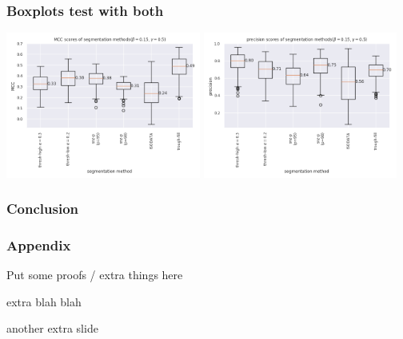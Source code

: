 \documentclass[9pt,notes]{beamer}
\begin{document}
\begin{frame}
\frametitle{Boxplots test with both}
\begin{center}
\includegraphics[width=0.48\textwidth]{190408-all-MCC-boxplot-semistrict}
\includegraphics[width=0.48\textwidth]{190408-all-precision-boxplot-semistrict}
\end{center}
\end{frame}

\begin{frame}
\frametitle{Conclusion}
\end{frame}

\appendix
{}
\setcounter{finalframe}{\value{framenumber}}

\begin{frame}
\frametitle{Appendix}
Put some proofs / extra things here
\end{frame}

\begin{frame}
extra blah blah
\end{frame}
\begin{frame}
another extra slide
\end{frame}
\setcounter{framenumber}{\value{finalframe}}
\end{document}
